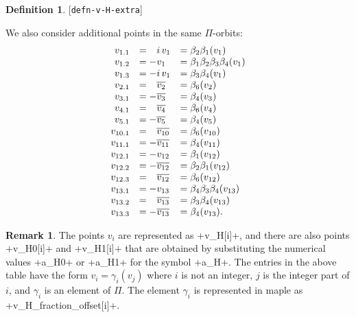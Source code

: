 \documentclass[reqno]{amsart}
\newcommand{\lbl}[1]{\label{#1}\textup{[\texttt{#1}]}\par}
\newcommand{\lbl}{\label}
\newcommand{\bt}        {\beta}
\newcommand{\gm}        {\gamma}
\newcommand{\ov}[1]     {\overline{#1}}
\newcommand{\pp}        {\hphantom{+}}
\renewcommand{\:}{\colon}
\theoremstyle{definition}
\newtheorem{remark}[theorem]{Remark}
\newtheorem{definition}[theorem]{Definition}
\begin{document}
\begin{definition}\lbl{defn-v-H-extra}
 We also consider additional points in the same $\Pi$-orbits:
 \[ \begin{array}{rll}
  v_{ 1.1} &= \pp i\,v_1     &= \bt_2\bt_1(v_1) \\
  v_{ 1.2} &= -      v_1     &= \bt_1\bt_2\bt_3\bt_4(v_1) \\
  v_{ 1.3} &= -i\,   v_1     &= \bt_3\bt_4(v_1) \\
  v_{ 2.1} &= \pp\ov{v_2   } &= \bt_6(v_2) \\
  v_{ 3.1} &= -  \ov{v_3   } &= \bt_4(v_3) \\
  v_{ 4.1} &= \pp\ov{v_4   } &= \bt_6(v_4) \\
  v_{ 5.1} &= -  \ov{v_5   } &= \bt_4(v_5) \\
  v_{10.1} &= \pp\ov{v_{10}} &= \bt_6(v_{10}) \\
  v_{11.1} &= -  \ov{v_{11}} &= \bt_4(v_{11}) \\
  v_{12.1} &= -      v_{12}  &= \bt_1(v_{12}) \\
  v_{12.2} &= -  \ov{v_{12}} &= \bt_2\bt_1(v_{12}) \\
  v_{12.3} &= \pp\ov{v_{12}} &= \bt_6(v_{12}) \\
  v_{13.1} &= -      v_{13}  &= \bt_4\bt_3\bt_4(v_{13}) \\
  v_{13.2} &= \pp\ov{v_{13}} &= \bt_3\bt_4(v_{13}) \\
  v_{13.3} &= -  \ov{v_{13}} &= \bt_4(v_{13}).
 \end{array} \]
\end{definition}
\begin{remark}
 The points $v_i$ are represented as \mcode+v_H[i]+, and there are also
 points \mcode+v_H0[i]+ and \mcode+v_H1[i]+ that are obtained by
 substituting the numerical values \mcode+a_H0+ or \mcode+a_H1+ for
 the symbol \mcode+a_H+.  The entries in the above table have the form
 $v_i=\gm_i(v_j)$ where $i$ is not an integer, $j$ is the integer part
 of $i$, and $\gm_i$ is an element of $\Pi$.  The element $\gm_i$
 is represented in maple as \mcode+v_H_fraction_offset[i]+.
\end{remark}
\end{document}
